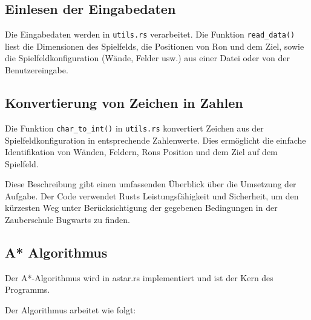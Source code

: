\subsection{Einlesen der Eingabedaten}
Die Eingabedaten werden in \texttt{utils.rs} verarbeitet.
Die Funktion \texttt{read\_data()} liest die Dimensionen des Spielfelds, die Positionen von Ron und dem Ziel,
sowie die Spielfeldkonfiguration (Wände, Felder usw.) aus einer Datei oder von der Benutzereingabe.

\subsection{Konvertierung von Zeichen in Zahlen}
Die Funktion \texttt{char\_to\_int()} in \texttt{utils.rs} konvertiert Zeichen aus der Spielfeldkonfiguration in entsprechende Zahlenwerte.
Dies ermöglicht die einfache Identifikation von Wänden, Feldern, Rons Position und dem Ziel auf dem Spielfeld.

Diese Beschreibung gibt einen umfassenden Überblick über die Umsetzung der Aufgabe. Der Code verwendet Rusts Leistungsfähigkeit und Sicherheit, um den kürzesten Weg unter Berücksichtigung der gegebenen Bedingungen in der Zauberschule Bugwarts zu finden.

\subsection{A* Algorithmus}
Der A*-Algorithmus wird in astar.rs implementiert und ist der Kern des Programms.

Der Algorithmus arbeitet wie folgt:

